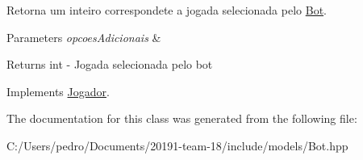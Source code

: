 Retorna um inteiro correspondete a jogada selecionada pelo \mbox{\hyperlink{class_bot}{Bot}}. 


\begin{DoxyParams}{Parameters}
{\em opcoes\+Adicionais} & \\
\hline
\end{DoxyParams}
\begin{DoxyReturn}{Returns}
int -\/ Jogada selecionada pelo bot 
\end{DoxyReturn}


Implements \mbox{\hyperlink{class_jogador}{Jogador}}.



The documentation for this class was generated from the following file\+:\begin{DoxyCompactItemize}
\item 
C\+:/\+Users/pedro/\+Documents/20191-\/team-\/18/include/models/Bot.\+hpp\end{DoxyCompactItemize}
